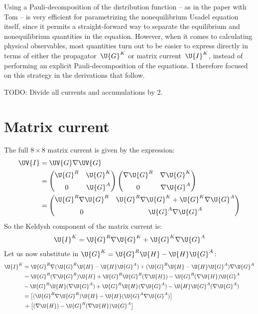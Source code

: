 Using a Pauli-decomposition of the distribution function -- as in the paper with Tom -- is very efficient for parametrizing the nonequilibrium Usadel equation itself, since it permits a straight-forward way to separate the equilibrium and nonequilibrium quantities in the equation.
However, when it comes to calculating physical observables, most quantities turn out to be easier to express directly in terms of either the propagator~$\U{G}^K$ or matrix current~$\U{I}^K$, instead of performing an explicit Pauli-decomposition of the equations.
I therefore focused on this strategy in the derivations that follow.

TODO: Divide all currents and accumulations by 2.


\clearpage
\section{Matrix current}
The full $8\times8$ matrix current is given by the expression:
\begin{align}
  \UV{I} 
  &= 
  \UV{G} \nabla \UV{G}
  \\ &= 
  \begin{pmatrix} 
    \U{G}^R  & \U{G}^K \\[1ex] 0 & \U{G}^A
  \end{pmatrix}
  \begin{pmatrix} 
    \nabla\U{G}^R  & \nabla\U{G}^K \\[1ex] 0 & \nabla\U{G}^A
  \end{pmatrix}
  \\ &= 
  \begin{pmatrix} 
    \U{G}^R\nabla\U{G}^R  & \U{G}^R\nabla\U{G}^K + \U{G}^K\nabla\U{G}^A \\[1ex] 0 & \U{G}^A\nabla\U{G}^A
  \end{pmatrix}
\end{align}
So the Keldysh component of the matrix current is:
\begin{align}
  \U{I}^K = \U{G}^R\nabla\U{G}^K + \U{G}^K\nabla\U{G}^A
\end{align}
Let us now substitute in $\U{G}^K = \U{G}^R \U{H} - \U{H} \U{G}^A$:
\begin{align*}
  \U{I}^K 
  &= 
  \U{G}^R\nabla(\U{G}^R \U{H} - \U{H} \U{G}^A)+ (\U{G}^R \U{H} - \U{H} \U{G}^A) \nabla\U{G}^A 
  \\ &=
  \U{G}^R(\nabla\U{G}^R) \U{H} + \U{G}^R\U{G}^R (\nabla\U{H}) - \U{G}^R (\nabla\U{H}) \U{G}^A 
  \\ &
  - \U{G}^R \U{H} (\nabla\U{G}^A) + \U{G}^R \U{H}(\nabla\U{G}^A) - \U{H} \U{G}^A (\nabla\U{G}^A)
  \\ &=
  \big[ (\U{G}^R \nabla \U{G}^R) \U{H} - \U{H} (\U{G}^A \nabla \U{G}^A) \big]
  \\ &\,+
  \big[ (\nabla\U{H}) - \U{G}^R (\nabla\U{H}) \U{G}^A \big]
\end{align*}
